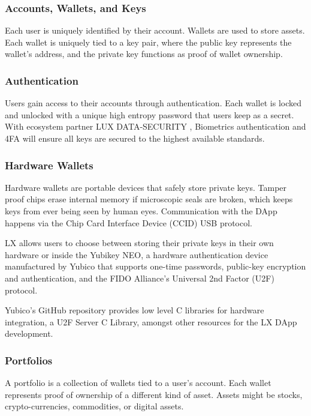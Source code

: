 \documentclass[11pt]{article}
\begin{document}
\subsubsection{Accounts, Wallets, and Keys}

Each user is uniquely identified by their account. Wallets are used to store assets. Each wallet is uniquely tied to a key pair, where the public key represents the wallet's address, and the private key functions as proof of wallet ownership.


\subsubsection{Authentication}

Users gain access to their accounts through authentication. Each wallet is locked and unlocked with a unique high entropy password that users keep as a secret. With ecosystem partner LUX DATA-SECURITY , Biometrics authentication and 4FA will ensure all keys are secured to the highest available standards.


\subsubsection{Hardware Wallets}

Hardware wallets are portable devices that safely store private keys. Tamper proof chips erase internal memory if microscopic seals are broken, which keeps keys from ever being seen by human eyes. Communication with the DApp happens via the Chip Card Interface Device (CCID) USB protocol.


LX allows users to choose between storing their private keys in their own hardware or inside the Yubikey NEO, a hardware authentication device manufactured by Yubico that supports one-time passwords, public-key encryption and authentication, and the FIDO Alliance's Universal 2nd Factor (U2F) protocol.


Yubico's GitHub repository provides low level C libraries for hardware integration, a U2F Server C Library, amongst other resources for the LX DApp development.


\subsubsection{Portfolios}

A portfolio is a collection of wallets tied to a user's account. Each wallet represents proof of ownership of a different kind of asset. Assets might be stocks, crypto-currencies, commodities, or digital assets.
\end{document}
